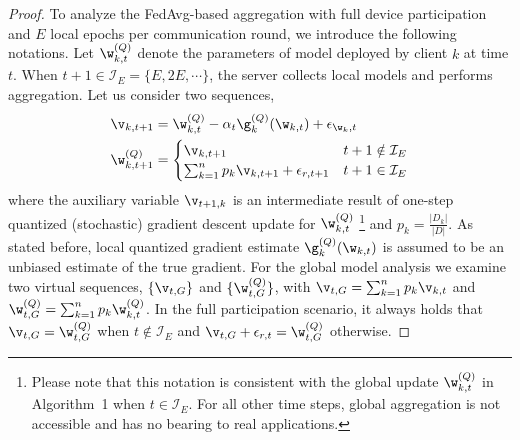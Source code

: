 \documentclass[a4paper,11pt]{article}
\begin{document}
\begin{proof}
To analyze the FedAvg-based aggregation with full device participation and $E$ local epochs per communication round, we introduce the following notations. Let $\w^{(Q)}_{k, t}$ denote the parameters of model deployed by client $k$ at time $t$. When $t+ 1 \in \mathcal{I}_E = \{E, 2E, \cdots \}$, the server collects local models and performs aggregation. Let us consider two sequences,
\begin{align*}
    \v_{k, t+1} & = \w^{(Q)}_{k, t} - \alpha_t \g^{(Q)}_k(\w_{k, t}) + \epsilon_{\w_k, t} \\
    \w^{(Q)}_{k, t+1} & = \begin{cases}
    \v_{k, t+1} & t+1 \notin \mathcal{I}_E \\
    \sum_{k=1}^n p_k \v_{k, t+1} + \epsilon_{r, t+1} & t+1 \in \mathcal{I}_E
    \end{cases}
\end{align*}
where the auxiliary variable $\v_{t+1, k}$ is an intermediate result of one-step quantized (stochastic) gradient descent update for $\w^{(Q)}_{k, t}$ \footnote{Please note that this notation is consistent with the global update $\w^{(Q)}_{k, t} $ in Algorithm~1 when $t \in \mathcal{I}_E$. For all other time steps, global aggregation is not accessible and has no bearing to real applications.} and $p_k = \frac{|D_k|}{|D|}$. As stated before, local quantized gradient estimate $\g^{(Q)}_k(\w_{k, t})$ is assumed to be an unbiased estimate of the true gradient. For the global model analysis we examine two virtual sequences, $\{\v_{t, G} \}$ and $ \{ \w^{(Q)}_{t, G} \}$, with $\v_{t, G} = \sum_{k=1}^n p_k \v_{k, t}$ and $\w^{(Q)}_{t, G} = \sum_{k=1}^n p_k\w^{(Q)}_{k, t}$. In the full participation scenario, it always holds that $\v_{t, G} = \w^{(Q)}_{t, G} $ when $t \notin \mathcal{I}_E$ and 
$\v_{t, G} + \epsilon_{r, t} = \w^{(Q)}_{t, G}$ otherwise. 


\end{proof}
\end{document}
